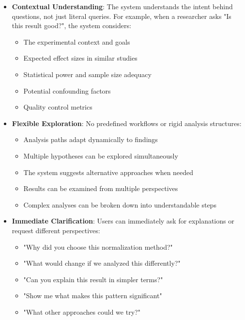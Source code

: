 \documentclass[11pt,a4paper]{article}
\begin{document}
\begin{itemize}
    \item \textbf{Contextual Understanding}: The system understands the intent behind questions, not just literal queries. For example, when a researcher asks "Is this result good?", the system considers:
    \begin{itemize}
        \item The experimental context and goals
        \item Expected effect sizes in similar studies
        \item Statistical power and sample size adequacy
        \item Potential confounding factors
        \item Quality control metrics
    \end{itemize}
    
    \item \textbf{Flexible Exploration}: No predefined workflows or rigid analysis structures:
    \begin{itemize}
        \item Analysis paths adapt dynamically to findings
        \item Multiple hypotheses can be explored simultaneously
        \item The system suggests alternative approaches when needed
        \item Results can be examined from multiple perspectives
        \item Complex analyses can be broken down into understandable steps
    \end{itemize}
    
    \item \textbf{Immediate Clarification}: Users can immediately ask for explanations or request different perspectives:
    \begin{itemize}
        \item "Why did you choose this normalization method?"
        \item "What would change if we analyzed this differently?"
        \item "Can you explain this result in simpler terms?"
        \item "Show me what makes this pattern significant"
        \item "What other approaches could we try?"
    \end{itemize}
    

\end{itemize}
\end{document}
